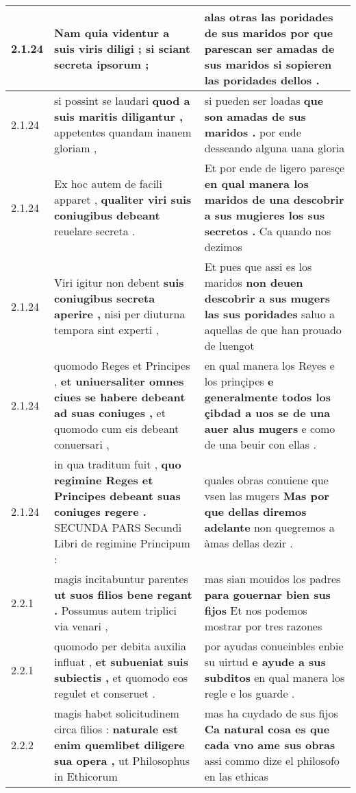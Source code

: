 \begin{tabular}{|p{1cm}|p{6.5cm}|p{6.5cm}|}
2.1.24 & Nam quia videntur \textbf{ a suis viris diligi ; } si sciant secreta ipsorum ; & alas otras las poridades de sus maridos \textbf{ por que parescan ser amadas de sus maridos } si sopieren las poridades dellos . \\\hline
2.1.24 & si possint se laudari \textbf{ quod a suis maritis diligantur , } appetentes quandam inanem gloriam , & si pueden ser loadas \textbf{ que son amadas de sus maridos . } por ende desseando alguna uana gloria \\\hline
2.1.24 & Ex hoc autem de facili apparet , \textbf{ qualiter viri suis coniugibus debeant } reuelare secreta . & Et por ende de ligero paresçe \textbf{ en qual manera los maridos de una descobrir a sus mugieres los sus secretos . } Ca quando nos dezimos \\\hline
2.1.24 & Viri igitur non debent \textbf{ suis coniugibus secreta aperire , } nisi per diuturna tempora sint experti , & Et pues que assi es los maridos \textbf{ non deuen descobrir a sus mugers las sus poridades } saluo a aquellas de que han prouado de luengot \\\hline
2.1.24 & quomodo Reges et Principes , \textbf{ et uniuersaliter omnes ciues se habere debeant ad suas coniuges , } et quomodo cum eis debeant conuersari , & en qual manera los Reyes e los prinçipes \textbf{ e generalmente todos los çibdad a uos se de una auer alus mugers } e como de una beuir con ellas . \\\hline
2.1.24 & in qua traditum fuit , \textbf{ quo regimine Reges et Principes debeant suas coniuges regere . } SECUNDA PARS Secundi Libri de regimine Principum : & quales obras conuiene que vsen las mugers \textbf{ Mas por que dellas diremos adelante } non quegremos a àmas dellas dezir . \\\hline
2.2.1 & magis incitabuntur parentes \textbf{ ut suos filios bene regant . } Possumus autem triplici via venari , & mas sian mouidos los padres \textbf{ para gouernar bien sus fijos } Et nos podemos mostrar por tres razones \\\hline
2.2.1 & quomodo per debita auxilia influat , \textbf{ et subueniat suis subiectis , } et quomodo eos regulet et conseruet . & por ayudas conueinbles enbie su uirtud \textbf{ e ayude a sus subditos } en qual manera los regle e los guarde . \\\hline
2.2.2 & magis habet solicitudinem circa filios : \textbf{ naturale est enim quemlibet diligere sua opera , } ut Philosophus in Ethicorum & mas ha cuydado de sus fijos \textbf{ Ca natural cosa es que cada vno ame sus obras } assi commo dize el philosofo en las ethicas \\\hline

\end{tabular}
